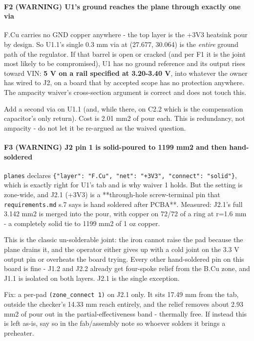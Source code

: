 \documentclass[11pt,a4paper]{article}
\begin{document}
\paragraph*{F2 (WARNING) U1's ground reaches the plane through exactly one via}
F.Cu carries no GND copper anywhere - the top layer is the +3V3 heatsink pour by design. So U1.1's single 0.3 mm via at (27.677, 30.064) is the \emph{entire} ground path of the regulator. If that barrel is open or cracked (and per F1 it is the joint most likely to be compromised), U1 has no ground reference and its output rises toward VIN: \textbf{5 V on a rail specified at 3.20-3.40 V}, into whatever the owner has wired to J2, on a board that by accepted scope has no protection anywhere. The ampacity waiver's cross-section argument is correct and does not touch this.

Add a second via on U1.1 (and, while there, on C2.2 which is the compensation capacitor's only return). Cost is 2.01 mm2 of pour each. This is redundancy, not ampacity - do not let it be re-argued as the waived question.

\paragraph*{F3 (WARNING) J2 pin 1 is solid-poured to 1199 mm2 and then hand-soldered}
\texttt{planes} declares \texttt{\{"layer": "F.Cu", "net": "+3V3", "connect": "solid"\}}, which is exactly right for U1's tab and is why waiver 1 holds. But the setting is zone-wide, and J2.1 (+3V3) is a {*}{*}through-hole screw-terminal pin that \texttt{requirements.md} s.7 says is hand soldered after PCBA{*}{*}. Measured: J2.1's full 3.142 mm2 is merged into the pour, with copper on 72/72 of a ring at r=1.6 mm - a completely solid tie to 1199 mm2 of 1 oz copper.

This is the classic un-solderable joint: the iron cannot raise the pad because the plane drains it, and the operator either gives up with a cold joint on the 3.3 V output pin or overheats the board trying. Every other hand-soldered pin on this board is fine - J1.2 and J2.2 already get four-spoke relief from the B.Cu zone, and J1.1 is isolated on both layers. J2.1 is the single exception.

Fix: a per-pad \texttt{(zone\_connect 1)} on J2.1 only. It sits 17.49 mm from the tab, outside the checker's 14.33 mm reach entirely, and the relief removes about 2.93 mm2 of pour out in the partial-effectiveness band - thermally free. If instead this is left as-is, say so in the fab/assembly note so whoever solders it brings a preheater.
\end{document}

